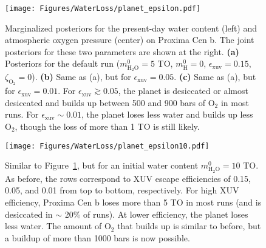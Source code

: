 \documentclass[preprint,12pt]{aastex}
\begin{document}
\begin{figure}[ht]
 \begin{center}
     \texttt{[image: Figures/WaterLoss/planet\_epsilon.pdf]}
      \caption{Marginalized posteriors for the present-day water content (left) and atmospheric oxygen
      pressure (center) on Proxima Cen b. The joint posteriors for these two parameters are shown at the 
      right. \textbf{(a)} Posteriors for the default run ($m_\mathrm{H_2O}^0 = 5$ TO, $m_\mathrm{H}^0 = 0$,
      $\epsilon_\mathrm{xuv} = 0.15$, $\zeta_\mathrm{O_2} = 0$). \textbf{(b)} Same as (a), but for
      $\epsilon_\mathrm{xuv} = 0.05$. \textbf{(c)} Same as (a), but for
      $\epsilon_\mathrm{xuv} = 0.01$. For $\epsilon_\mathrm{xuv} \gtrsim 0.05$, the planet is desiccated or
      almost desiccated and builds up between 500 and 900 bars of O$_2$ in most runs. For $\epsilon_\mathrm{xuv} \sim 0.01$,
      the planet loses less water and builds up less O$_2$, though the loss of more than 1 TO is still likely.
      }
    \label{fig:planet_epsilon}
 \end{center}
\end{figure}

\begin{figure}[ht]
 \begin{center}
     \texttt{[image: Figures/WaterLoss/planet\_epsilon10.pdf]}
      \caption{Similar to Figure~\ref{fig:planet_epsilon}, but for an initial water content
      $m_\mathrm{H_2O}^0 = 10$ TO. As before, the rows correspond to XUV escape efficiencies of
      0.15, 0.05, and 0.01 from top to bottom, respectively. For high XUV efficiency, Proxima
      Cen b loses more than 5 TO in most runs (and is desiccated in $\sim$ 20\% of runs). At lower
      efficiency, the planet loses less water. The amount of O$_2$ that builds up is similar
      to before, but a buildup of more than 1000 bars is now possible.}
    \label{fig:planet_epsilon10}
 \end{center}
\end{figure}
\end{document}
